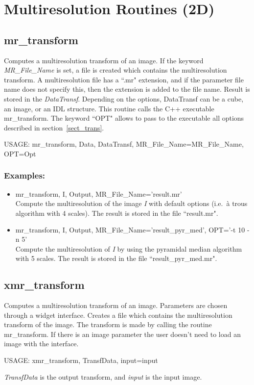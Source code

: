 \section{Multiresolution Routines (2D)}

\subsection{mr\_transform}
Computes a multiresolution transform of an image. If the
keyword {\em MR\_File\_Name} is set, a file is created
which contains the multiresolution transform. A multiresolution file
has a ``.mr" extension, and if the parameter file name does not 
specify this, then
the extension is added to the file name. Result is stored in the {\em 
DataTransf}. 
Depending on the options, DataTransf can be a cube, an
image, or an IDL structure. This routine calls 
the C++ executable {mr\_transform}. 
The keyword ``OPT" allows to pass to the executable all
options described in section~\ref{sect_trans}.

{\bf
\begin{center}
  USAGE: mr\_transform, Data, DataTransf, MR\_File\_Name=MR\_File\_Name, OPT=Opt
\end{center}}
\subsubsection*{Examples:}
\begin{itemize}
\item mr\_transform, I, Output, MR\_File\_Name='result.mr' \\
Compute the multiresolution of the image {\em I} with default options
(i.e.\ \`a trous algorithm with 4 scales). The result is stored in 
the file ``result.mr".
\item mr\_transform, I, Output, MR\_File\_Name='result\_pyr\_med', 
OPT='-t 10 -n 5' \\
Compute the multiresolution of {\em I}  by using the pyramidal median 
algorithm with 5 scales. The result is stored in the file
``result\_pyr\_med.mr".
\end{itemize}

\subsection{xmr\_transform}
Computes a multiresolution transform of an image. Parameters are
chosen through a widget interface. Creates a file which contains
the multiresolution transform of the image. The transform is made
by calling the routine mr\_transform. If there is an image parameter
the user doesn't need to load an image with the interface.  
{\bf
\begin{center}
   USAGE: xmr\_transform, TransfData, input=input
\end{center}}
{\em TransfData} is the output transform, and {\em input} is the input
image. 


